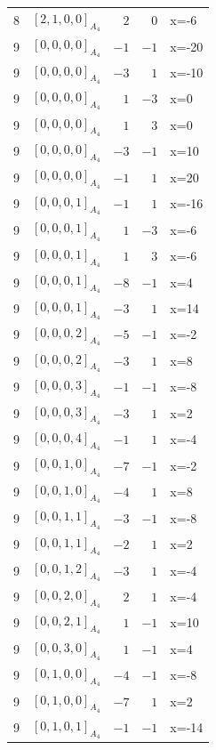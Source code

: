 \documentclass[11pt]{article}
\newcommand{\Dynkin}[1]{#1}
\begin{document}
\begin{longtable}{r l r r l}
8 & $\Dynkin{[2,1,0,0]_{A_4}}$ & $2$ & $0$ & x=-6\\
9 & $\Dynkin{[0,0,0,0]_{A_4}}$ & $-1$ & $-1$ & x=-20\\
9 & $\Dynkin{[0,0,0,0]_{A_4}}$ & $-3$ & $1$ & x=-10\\
9 & $\Dynkin{[0,0,0,0]_{A_4}}$ & $1$ & $-3$ & x=0\\
9 & $\Dynkin{[0,0,0,0]_{A_4}}$ & $1$ & $3$ & x=0\\
9 & $\Dynkin{[0,0,0,0]_{A_4}}$ & $-3$ & $-1$ & x=10\\
9 & $\Dynkin{[0,0,0,0]_{A_4}}$ & $-1$ & $1$ & x=20\\
9 & $\Dynkin{[0,0,0,1]_{A_4}}$ & $-1$ & $1$ & x=-16\\
9 & $\Dynkin{[0,0,0,1]_{A_4}}$ & $1$ & $-3$ & x=-6\\
9 & $\Dynkin{[0,0,0,1]_{A_4}}$ & $1$ & $3$ & x=-6\\
9 & $\Dynkin{[0,0,0,1]_{A_4}}$ & $-8$ & $-1$ & x=4\\
9 & $\Dynkin{[0,0,0,1]_{A_4}}$ & $-3$ & $1$ & x=14\\
9 & $\Dynkin{[0,0,0,2]_{A_4}}$ & $-5$ & $-1$ & x=-2\\
9 & $\Dynkin{[0,0,0,2]_{A_4}}$ & $-3$ & $1$ & x=8\\
9 & $\Dynkin{[0,0,0,3]_{A_4}}$ & $-1$ & $-1$ & x=-8\\
9 & $\Dynkin{[0,0,0,3]_{A_4}}$ & $-3$ & $1$ & x=2\\
9 & $\Dynkin{[0,0,0,4]_{A_4}}$ & $-1$ & $1$ & x=-4\\
9 & $\Dynkin{[0,0,1,0]_{A_4}}$ & $-7$ & $-1$ & x=-2\\
9 & $\Dynkin{[0,0,1,0]_{A_4}}$ & $-4$ & $1$ & x=8\\
9 & $\Dynkin{[0,0,1,1]_{A_4}}$ & $-3$ & $-1$ & x=-8\\
9 & $\Dynkin{[0,0,1,1]_{A_4}}$ & $-2$ & $1$ & x=2\\
9 & $\Dynkin{[0,0,1,2]_{A_4}}$ & $-3$ & $1$ & x=-4\\
9 & $\Dynkin{[0,0,2,0]_{A_4}}$ & $2$ & $1$ & x=-4\\
9 & $\Dynkin{[0,0,2,1]_{A_4}}$ & $1$ & $-1$ & x=10\\
9 & $\Dynkin{[0,0,3,0]_{A_4}}$ & $1$ & $-1$ & x=4\\
9 & $\Dynkin{[0,1,0,0]_{A_4}}$ & $-4$ & $-1$ & x=-8\\
9 & $\Dynkin{[0,1,0,0]_{A_4}}$ & $-7$ & $1$ & x=2\\
9 & $\Dynkin{[0,1,0,1]_{A_4}}$ & $-1$ & $-1$ & x=-14\\

\end{longtable}
\end{document}
